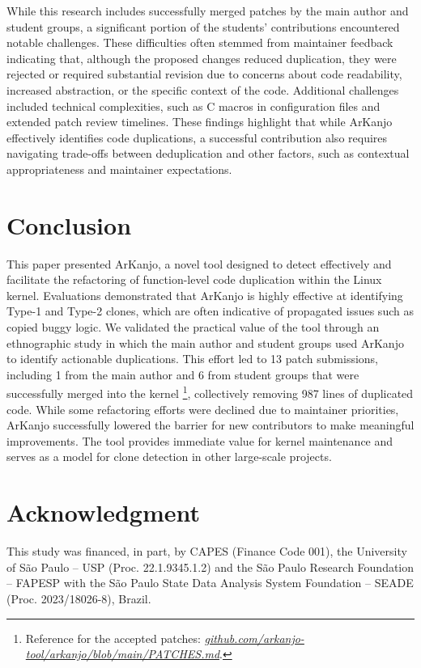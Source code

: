 \documentclass[conference]{IEEEtran}
\begin{document}
While this research includes successfully merged patches by the main author and student groups,
a significant portion of the students' contributions encountered notable challenges. These difficulties 
often stemmed from maintainer feedback indicating that, although the proposed changes reduced duplication, 
they were rejected or required substantial revision due to concerns about code readability, increased abstraction, 
or the specific context of the code. Additional challenges included technical complexities, such as C macros in 
configuration files and extended patch review timelines. These findings highlight that while ArKanjo 
effectively identifies code duplications, a successful 
contribution also requires navigating trade-offs between deduplication and other factors, such as 
contextual appropriateness and maintainer expectations.


\section{Conclusion}

This paper presented ArKanjo, a novel tool designed to detect effectively and facilitate the refactoring of 
function-level code duplication within the Linux kernel. 
Evaluations demonstrated that ArKanjo is highly effective at identifying Type-1 and Type-2 
clones, which are often indicative of propagated issues such as copied buggy logic. We validated the practical 
value of the tool through an ethnographic study in which the main author and student groups used ArKanjo 
to identify actionable duplications. This effort led to 13 patch submissions, including 1 
from the main author and 6 from student groups that were successfully merged into the kernel
\footnote{Reference for the accepted patches:  
\textit{\href{https://github.com/arkanjo-tool/arkanjo/blob/main/PATCHES.md}{github.com/arkanjo-tool/arkanjo/blob/main/PATCHES.md}}.
}, collectively removing 987 lines of duplicated code. While some refactoring efforts were declined due to maintainer priorities, ArKanjo successfully lowered the barrier 
for new contributors to make meaningful improvements. The tool provides immediate value for 
kernel maintenance and serves as a model for clone detection in other large-scale projects.

\section*{Acknowledgment}

This study was financed, in part, by CAPES (Finance Code 001), the University of São Paulo – USP (Proc. 22.1.9345.1.2) and the São Paulo Research Foundation – FAPESP with the São Paulo State Data Analysis System Foundation – SEADE (Proc. 2023/18026-8), Brazil.

\newpage


\end{document}
